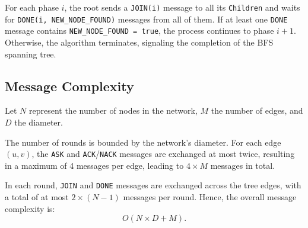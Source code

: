 For each phase \( i \), the root sends a \texttt{JOIN(i)} message to all its \texttt{Children} and waits for \texttt{DONE(i, NEW\_NODE\_FOUND)} messages from all of them. If at least one \texttt{DONE} message contains \texttt{NEW\_NODE\_FOUND = true}, the process continues to phase \( i+1 \). Otherwise, the algorithm terminates, signaling the completion of the BFS spanning tree.

\subsection{Message Complexity}
Let \( N \) represent the number of nodes in the network, \( M \) the number of edges, and \( D \) the diameter.

The number of rounds is bounded by the network's diameter. For each edge \( (u, v) \), the \texttt{ASK} and \texttt{ACK}/\texttt{NACK} messages are exchanged at most twice, resulting in a maximum of 4 messages per edge, leading to \( 4 \times M \) messages in total.

In each round, \texttt{JOIN} and \texttt{DONE} messages are exchanged across the tree edges, with a total of at most \( 2 \times (N-1) \) messages per round. Hence, the overall message complexity is:
\[
O(N \times D + M).
\]

